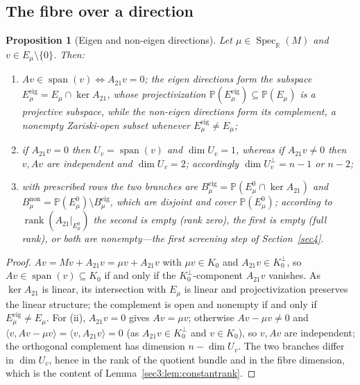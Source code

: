 \documentclass[journal]{IEEEtran}
\theoremstyle{plainn}
\newtheorem{prop}[thm]{Proposition}
\theoremstyle{remark}
\newcommand{\rank}{\operatorname{rank}}
\begin{document}
\subsection{The fibre over a direction}
\label{sec3:sub:strata}
\label{sec3:sub:constrank}
\label{sec3:sub:fibre}
\begin{prop}[Eigen and non-eigen directions]
\label{sec3:lem:eigen}
\label{sec3:prop:strata}
\label{sec3:lem:dimU}
\label{sec3:rem:rankcases}
Let $\mu\in\operatorname{Spec}_{\mathbb{R}}(M)$ and $v\in E_\mu\setminus\{0\}$. Then:
\begin{enumerate}[label=(\roman*),leftmargin=*,itemsep=1pt,topsep=2pt]
\item $Av\in\operatorname{span}(v)\iff A_{21}v=0$; the \emph{eigen directions} form the subspace
$E_\mu^{\mathrm{eig}}=E_\mu\cap\ker A_{21}$, whose projectivization
$\mathbb{P}(E_\mu^{\mathrm{eig}})\subseteq\mathbb{P}(E_\mu)$ is a projective subspace, while the
\emph{non-eigen directions} form its complement, a nonempty Zariski-open subset whenever
$E_\mu^{\mathrm{eig}}\ne E_\mu$;
\item if $A_{21}v=0$ then $U_v=\operatorname{span}(v)$ and $\dim U_v=1$, whereas if $A_{21}v\ne0$ then
$v,Av$ are independent and $\dim U_v=2$; accordingly $\dim U_v^\perp=n-1$ or $n-2$;
\item with prescribed rows the two branches are $B_\mu^{\mathrm{eig}}=\mathbb{P}(E_\mu^0\cap\ker A_{21})$
and $B_\mu^{\mathrm{non}}=\mathbb{P}(E_\mu^0)\setminus B_\mu^{\mathrm{eig}}$, which are disjoint and
cover $\mathbb{P}(E_\mu^0)$; according to $\rank(A_{21}|_{E_\mu^0})$ the second is empty (rank zero),
the first is empty (full rank), or both are nonempty—the first screening step of
Section~\ref{sec4}.
\end{enumerate}
\end{prop}
\begin{proof}
$Av=Mv+A_{21}v=\mu v+A_{21}v$ with $\mu v\in K_0$ and $A_{21}v\in K_0^\perp$, so
$Av\in\operatorname{span}(v)\subseteq K_0$ if and only if the $K_0^\perp$-component $A_{21}v$ vanishes.
As $\ker A_{21}$ is linear, its intersection with $E_\mu$ is linear and projectivization preserves the
linear structure; the complement is open and nonempty if and only if
$E_\mu^{\mathrm{eig}}\ne E_\mu$. For (ii), $A_{21}v=0$ gives $Av=\mu v$; otherwise $Av-\mu v\ne0$ and
$\langle v,Av-\mu v\rangle=\langle v,A_{21}v\rangle=0$ (as $A_{21}v\in K_0^\perp$ and $v\in K_0$), so
$v,Av$ are independent; the orthogonal complement has dimension $n-\dim U_v$. The two branches differ
in $\dim U_v$, hence in the rank of the quotient bundle and in the fibre dimension, which is the
content of Lemma~\ref{sec3:lem:constantrank}.
\end{proof}
\end{document}
